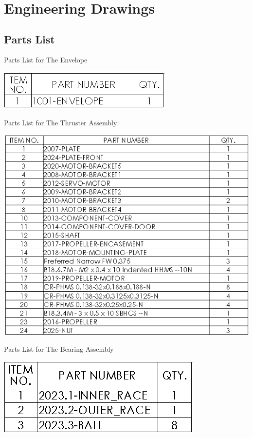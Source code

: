 \documentclass[../main.tex]{subfiles}
\begin{document}
	\chapter{Engineering Drawings}
	\section{Parts List}
	
	\begin{table}[H]
		\centering
		\caption{Parts List for The Envelope}
		\includegraphics[width=.4\linewidth]{img/dwgs/Envelope.PNG}
		\label{fig:envelopeParts}
	\end{table}

	\begin{table}[H]
		\centering
		\caption{Parts List for The Thruster Assembly}
		\includegraphics[width=.85\linewidth]{img/dwgs/thrusterAsm.PNG}
		\label{fig:thrusterParts}
	\end{table}

	\begin{table}[H]
		\centering
		\caption{Parts List for The Bearing Assembly}
		\includegraphics[width=.35\linewidth]{img/dwgs/bearingAsm.PNG}
		\label{fig:bearingParts}
	\end{table}
\end{document}
